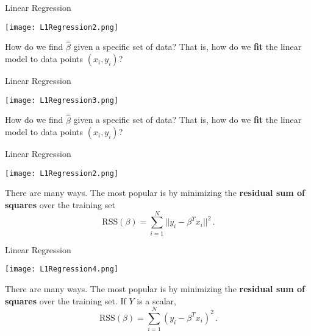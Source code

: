 \documentclass[10pt, handout]{beamer}
\begin{document}
\begin{frame}[fragile]{Linear Regression}
  \begin{minipage}[t][0.5\textheight][t]{\textwidth}
    \centering
     \texttt{[image: L1Regression2.png]}
  \end{minipage}
  \vfill
  \begin{minipage}[t][0.5\textheight][t]{\textwidth}
How do we find $\hat\beta$ given a specific set of data? That is, how do we \textbf{fit} the linear model to data points $(x_i,y_i)$?
  \end{minipage}
\end{frame}


\begin{frame}[fragile]{Linear Regression}
  \begin{minipage}[t][0.5\textheight][t]{\textwidth}
    \centering
     \texttt{[image: L1Regression3.png]}
  \end{minipage}
  \vfill
  \begin{minipage}[t][0.5\textheight][t]{\textwidth}
How do we find $\hat\beta$ given a specific set of data? That is, how do we \textbf{fit} the linear model to data points $(x_i,y_i)$?
  \end{minipage}
\end{frame}



\begin{frame}[fragile]{Linear Regression}
  \begin{minipage}[t][0.5\textheight][t]{\textwidth}
    \centering
     \texttt{[image: L1Regression2.png]}
  \end{minipage}
  \vfill
  \begin{minipage}[t][0.5\textheight][t]{\textwidth}
There are many ways. The most popular is by minimizing the \textbf{residual sum of squares} over the training set
$$
\text{RSS}(\beta) = \sum_{i=1}^N||y_i - \beta^T x_i||^2\,.
$$
  \end{minipage}
\end{frame}


\begin{frame}[fragile]{Linear Regression}
  \begin{minipage}[t][0.5\textheight][t]{\textwidth}
    \centering
     \texttt{[image: L1Regression4.png]}
  \end{minipage}
  \vfill
  \begin{minipage}[t][0.5\textheight][t]{\textwidth}
There are many ways. The most popular is by minimizing the \textbf{residual sum of squares} over the training set. If $Y$ is a scalar,
$$
\text{RSS}(\beta) = \sum_{i=1}^N(y_i - \beta^T x_i)^2\,.
$$
  \end{minipage}
\end{frame}
\end{document}
